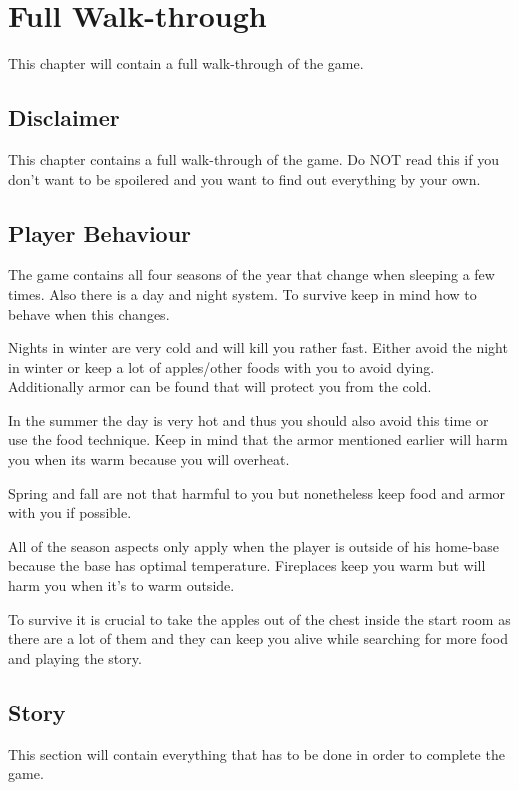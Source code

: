 \documentclass[a4paper]{scrreprt}
\begin{document}
\chapter{Full Walk-through}

This chapter will contain a full walk-through of the game.

\section{Disclaimer}

This chapter contains a full walk-through of the game. Do NOT read this if you don't want to be spoilered and you want to find out everything by your own.

\section{Player Behaviour}

The game contains all four seasons of the year that change when sleeping a few times. Also there is a day and night system. To survive keep in mind how to behave when this changes. 

Nights in winter are very cold and will kill you rather fast. Either avoid the night in winter or keep a lot of apples/other foods with you to avoid dying. Additionally armor can be found that will protect you from the cold. 

In the summer the day is very hot and thus you should also avoid this time or use the food technique. Keep in mind that the armor mentioned earlier will harm you when its warm because you will overheat.

Spring and fall are not that harmful to you but nonetheless keep food and armor with you if possible.

All of the season aspects only apply when the player is outside of his home-base because the base has optimal temperature. Fireplaces keep you warm but will harm you when it's to warm outside.

To survive it is crucial to take the apples out of the chest inside the start room as there are a lot of them and they can keep you alive while searching for more food and playing the story.

\section{Story}

This section will contain everything that has to be done in order to complete the game.
\end{document}
